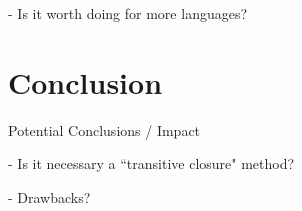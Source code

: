 \documentclass[10pt,a4paper]{llncs}
\begin{document}
- Is it worth doing for more languages?

\section{Conclusion}

Potential Conclusions / Impact

- Is it necessary a ``transitive closure" method?

- Drawbacks?




\end{document}
